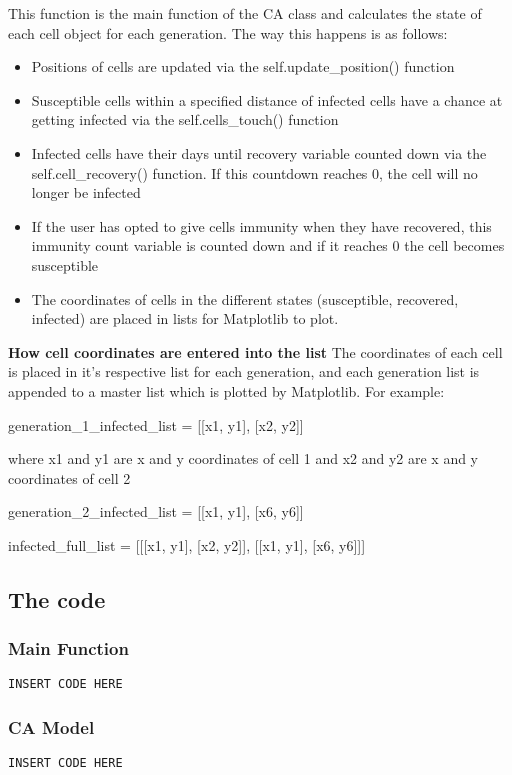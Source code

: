 \documentclass[11pt, a4paper]{article}
\begin{document}
This function is the main function of the CA class and calculates the state of each cell object for each generation. The way this happens is as follows:
\begin{itemize}
    \item Positions of cells are updated via the self.update\_position() function
    \item Susceptible cells within a specified distance of infected cells have a chance at getting infected via the self.cells\_touch() function
    \item Infected cells have their days until recovery variable counted down via the self.cell\_recovery() function. If this countdown reaches 0, the cell will no longer be infected
    \item If the user has opted to give cells immunity when they have recovered, this immunity count variable is counted down and if it reaches 0 the cell becomes susceptible
    \item The coordinates of cells in the different states (susceptible, recovered, infected) are placed in lists for Matplotlib to plot. 
\end{itemize}
\textbf{How cell coordinates are entered into the list}
The coordinates of each cell is placed in it's respective list for each generation, and each generation list is appended to a master list which is plotted by Matplotlib. For example:

generation\_1\_infected\_list = [[x1, y1], [x2, y2]] 

where x1 and y1 are x and y coordinates of cell 1 and x2 and y2 are x and y coordinates of cell 2

generation\_2\_infected\_list = [[x1, y1], [x6, y6]]

infected\_full\_list = [[[x1, y1], [x2, y2]], [[x1, y1], [x6, y6]]]



\subsection{The code}

\subsubsection{Main Function}
\begin{lstlisting}
INSERT CODE HERE
\end{lstlisting}

\subsubsection{CA Model}
\begin{lstlisting}
INSERT CODE HERE
\end{lstlisting}
\end{document}
